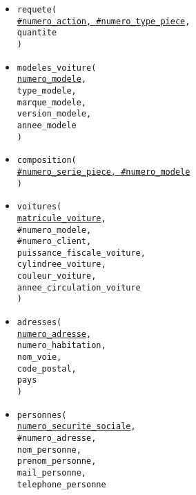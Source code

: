 \documentclass[a4paper,11pt]{article} %
\begin{document}
\begin{itemize}[leftmargin=*]
    \item \texttt{requete( \\
        \underline{\#numero\_action, \#numero\_type\_piece}, \\
        quantite \\
    )}
    \item \texttt{modeles\_voiture( \\
        \underline{numero\_modele}, \\
        type\_modele, \\
        marque\_modele, \\
        version\_modele, \\
        annee\_modele \\
    )}
    \item \texttt{composition( \\
        \underline{\#numero\_serie\_piece, \#numero\_modele} \\
    )}
    \item \texttt{voitures( \\
        \underline{matricule\_voiture}, \\
        \#numero\_modele, \\
        \#numero\_client,    \\
        puissance\_fiscale\_voiture, \\
        cylindree\_voiture, \\
        couleur\_voiture, \\
        annee\_circulation\_voiture \\
    )}
    \item \texttt{adresses( \\
        \underline{numero\_adresse}, \\
        numero\_habitation, \\
        nom\_voie, \\
        code\_postal, \\
        pays \\
    )}
    \item \texttt{personnes( \\
        \underline{numero\_securite\_sociale}, \\
        \#numero\_adresse, \\
        nom\_personne, \\
        prenom\_personne, \\
        mail\_personne, \\
        telephone\_personne \\
}
\end{itemize}
\end{document}
